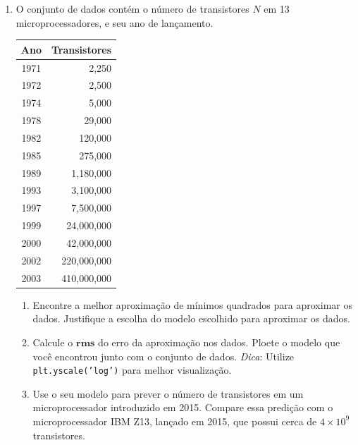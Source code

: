 \documentclass[a4paper,12pt]{article}
\begin{document}
\begin{enumerate}
\begin{enumerate}
    \end{enumerate} 


    \item O conjunto de dados contém o número de transistores $N$ em 13 microprocessadores, e seu ano de lançamento.
    
    \begin{table}[htb!]
        \centering
        \begin{tabular}{cr}
        \hline
        Ano  & \multicolumn{1}{c}{Transistores} \\ \hline
        1971 & 2,250                            \\
        1972 & 2,500                            \\
        1974 & 5,000                            \\
        1978 & 29,000                           \\
        1982 & 120,000                          \\
        1985 & 275,000                          \\
        1989 & 1,180,000                        \\
        1993 & 3,100,000                        \\
        1997 & 7,500,000                        \\
        1999 & 24,000,000                       \\
        2000 & 42,000,000                       \\
        2002 & 220,000,000                      \\
        2003 & 410,000,000                      \\ \hline
        \end{tabular}
    \end{table}
    \begin{enumerate}
        \item Encontre a melhor aproximação de mínimos quadrados para aproximar os dados. Justifique a escolha do modelo escolhido para aproximar os dados.
        \item Calcule o $\mathbf{\text{rms}}$ do erro da aproximação nos dados. Ploete o modelo que você encontrou junto com o conjunto de dados. \textit{Dica}: Utilize \texttt{plt.yscale('log')} para melhor visualização.
        \item Use o seu modelo para prever o número de transistores em um microprocessador introduzido em 2015. Compare essa predição com o microprocessador IBM Z13, lançado em 2015, que possui cerca de $4 \times 10^9$ transistores.


\end{enumerate}
\end{enumerate}
\end{document}
